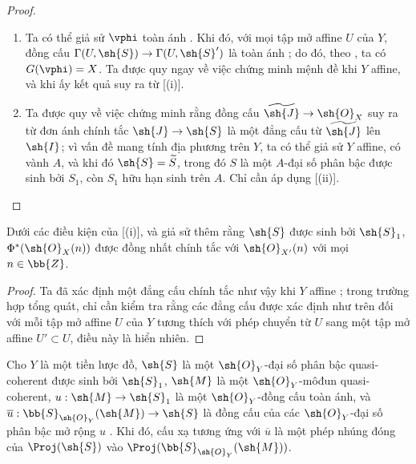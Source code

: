 \documentclass[oneside,10pt]{amsart}
\makeatletter
\newcommand{\ega@arrow}[2]{\mathchoice{#1}{#2}{#2}{#2}}
\renewcommand{\to}{\ega@arrow{\longrightarrow}{\rightarrow}}
\let\EGAOriginalLabel\label
\renewcommand{\label}[1]{\phantomsection\EGAOriginalLabel{#1}}
\makeatother
\begin{document}
\begin{proof}
\medskip\noindent
\begin{enumerate}
  \item[(i)] Ta có thể giả sử $\vphi$ toàn ánh .
    Khi đó, với mọi tập mở affine $U$ của $Y$, đồng cấu $\Gamma(U,\sh{S})\to\Gamma(U,\sh{S}')$ là toàn ánh ; do đó, theo , ta có $G(\vphi)=X$.
    Ta được quy ngay về việc chứng minh mệnh đề khi $Y$ affine, và khi ấy kết quả suy ra từ [(i)].
  \item[(ii)] Ta được quy về việc chứng minh rằng đồng cấu $\widetilde{\sh{J}}\to\sh{O}_X$ suy ra từ đơn ánh chính tắc $\sh{J}\to\sh{S}$ là một đẳng cấu từ $\widetilde{\sh{J}}$ lên $\sh{I}$;
    vì vấn đề mang tính địa phương trên $Y$, ta có thể giả sử $Y$ affine, có vành $A$, và khi đó $\sh{S}=\widetilde{S}$, trong đó $S$ là một $A$-đại số phân bậc được sinh bởi $S_1$, còn $S_1$ hữu hạn sinh trên $A$.
    Chỉ cần áp dụng [(ii)].
\end{enumerate}
\end{proof}

\begin{corollary}[3.6.3]
\label{II.3.6.3}
Dưới các điều kiện của [(i)], và giả sử thêm rằng $\sh{S}$ được sinh bởi $\sh{S}_1$, $\Phi^*(\sh{O}_X(n))$ được đồng nhất chính tắc với $\sh{O}_{X'}(n)$ với mọi $n\in\bb{Z}$.
\end{corollary}

\begin{proof}
Ta đã xác định một đẳng cấu chính tắc như vậy khi $Y$ affine ;
trong trường hợp tổng quát, chỉ cần kiểm tra rằng các đẳng cấu được xác định như trên đối với mỗi tập mở affine $U$ của $Y$ tương thích với phép chuyển từ $U$ sang một tập mở affine $U'\subset U$, điều này là hiển nhiên.
\end{proof}

\begin{corollary}[3.6.4]
\label{II.3.6.4}
Cho $Y$ là một tiền lược đồ, $\sh{S}$ là một $\sh{O}_Y$-đại số phân bậc quasi-coherent được sinh bởi $\sh{S}_1$, $\sh{M}$ là một $\sh{O}_Y$-môđun quasi-coherent, $u:\sh{M}\to\sh{S}_1$ là một $\sh{O}_Y$-đồng cấu toàn ánh, và $\overline{u}:\bb{S}_{\sh{O}_Y}(\sh{M})\to\sh{S}$ là đồng cấu của các $\sh{O}_Y$-đại số phân bậc mở rộng $u$ .
Khi đó, cấu xạ tương ứng với $\overline{u}$ là một phép nhúng đóng của $\Proj(\sh{S})$ vào $\Proj(\bb{S}_{\sh{O}_Y}(\sh{M}))$.
\end{corollary}
\end{document}

